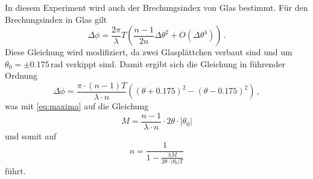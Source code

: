 In diesem Experiment wird auch der Brechungsindex von Glas bestimmt. Für den Brechungsindex in Glas gilt
\begin{equation}\label{eq:phiglas}
    \Delta \phi = \frac{2\pi}{\lambda}T\left(\frac{n-1}{2n}\Delta \theta^2+O( \Delta \theta^4)\right) \, .
\end{equation}
Diese Gleichung wird modifiziert, da zwei Glasplättchen verbaut sind und um $\theta_0 = \pm 0.175\,\text{rad}$ verkippt sind. Damit ergibt sich die Gleichung in führender Ordnung
\begin{equation}
    \Delta \phi = \frac{\pi \cdot (n - 1) T}{\lambda \cdot n} \left(\left( \theta + 0.175 \right)^2 - \left( \theta - 0.175 \right)^2\right) \, ,
\end{equation}
was mit \autoref{eq:maxima} auf die Gleichung
\begin{equation*}
    M = \frac{n - 1}{\lambda \cdot n} \cdot 2 \theta \cdot |\theta_0|
\end{equation*}
und somit auf
\begin{equation} \label{eq:n_Glas}
    n = \frac{1}{1- \frac{\lambda M}{ 2 \theta \cdot |\theta_0| T}}
\end{equation}
führt.